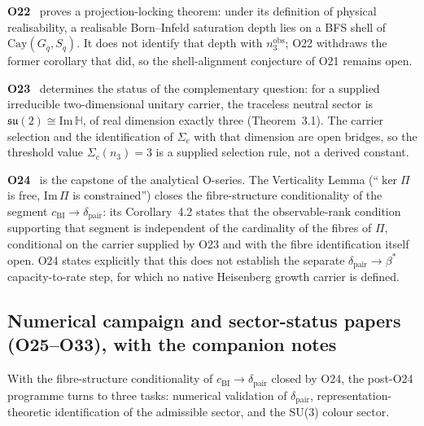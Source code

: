 \documentclass[11pt,a4paper]{article}
\theoremstyle{definition}
\newcommand{\Cay}{\mathrm{Cay}}
\renewcommand{\Im}{\mathrm{Im}\,}
\newcommand{\dimpair}{\delta_{\mathrm{pair}}}
\newcommand{\betastar}{\beta^*}
\newcommand{\cchi}{c_{\mathrm{BI}}}
\newcommand{\nobs}{n^{\mathrm{obs}}_3}
\begin{document}
      \textbf{O22}~\cite{Beau2026a26} proves a projection-locking theorem: under its definition of
      physical realisability, a realisable Born--Infeld saturation depth lies on a BFS shell of
      $\Cay(G_q, S_q)$.
      It does not identify that depth with $\nobs$; O22 withdraws the former corollary that did, so
      the shell-alignment conjecture of O21 remains open.

      \textbf{O23}~\cite{Beau2026a27} determines the status of the complementary question: for a
      supplied irreducible two-dimensional unitary carrier, the traceless neutral sector is
      $\mathfrak{su}(2) \cong \Im\mathbb{H}$, of real dimension exactly three (Theorem~3.1).
      The carrier selection and the identification of $\Sigma_c$ with that dimension are open
      bridges, so the threshold value $\Sigma_c(n_3) = 3$ is a supplied selection rule, not a
      derived constant.

      \textbf{O24}~\cite{Beau2026a28} is the capstone of the analytical O-series.
      The Verticality Lemma (``$\ker\Pi$ is free, $\Im\Pi$ is constrained'') closes the
      fibre-structure conditionality of the segment $\cchi \to \dimpair$: its Corollary~4.2 states
      that the observable-rank condition supporting that segment is independent of the cardinality
      of the fibres of $\Pi$, conditional on the carrier supplied by O23 and with the fibre
      identification itself open.
      O24 states explicitly that this does not establish the separate $\dimpair \to \betastar$
      capacity-to-rate step, for which no native Heisenberg growth carrier is defined.

    \subsection{Numerical campaign and sector-status papers (O25--O33), with the companion notes}
      \label{sec:numerical}

      With the fibre-structure conditionality of $\cchi \to \dimpair$ closed by O24, the
      post-O24 programme turns to three tasks:
      numerical validation of $\dimpair$, representation-theoretic identification of the
      admissible sector, and the SU(3) colour sector.
\end{document}
